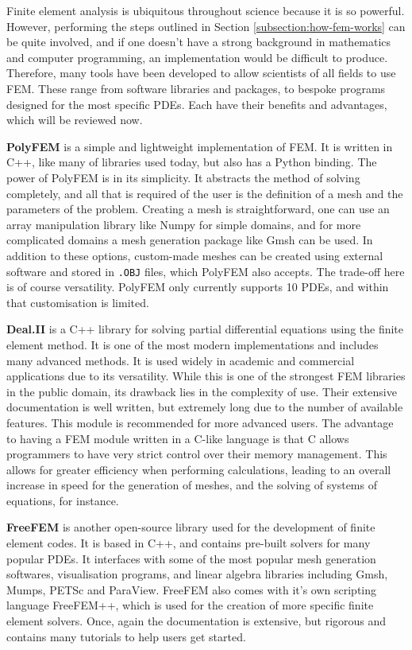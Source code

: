 Finite element analysis is ubiquitous throughout science because it is so powerful. However, performing the steps outlined in Section \ref{subsection:how-fem-works} can be quite involved, and if one doesn't have a strong background in mathematics and computer programming, an implementation would be difficult to produce. Therefore, many tools have been developed to allow scientists of all fields to use FEM. These range from software libraries and packages, to bespoke programs designed for the most specific PDEs. Each have their benefits and advantages, which will be reviewed now.

\textbf{PolyFEM} \cite{polyfem} is a simple and lightweight implementation of FEM. It is written in C++, like many of libraries used today, but also has a Python binding. The power of PolyFEM is in its simplicity. It abstracts the method of solving completely, and all that is required of the user is the definition of a mesh and the parameters of the problem. Creating a mesh is straightforward, one can use an array manipulation library like Numpy for simple domains, and for more complicated domains a mesh generation package like Gmsh can be used. In addition to these options, custom-made meshes can be created using external software and stored in \verb|.OBJ| files, which PolyFEM also accepts. The trade-off here is of course versatility. PolyFEM only currently supports 10 PDEs, and within that customisation is limited.

\textbf{Deal.II} \cite{deal-ii} is a C++ library for solving partial differential equations using the finite element method. It is one of the most modern implementations and includes many advanced methods. It is used widely in academic and commercial applications due to its versatility. While this is one of the strongest FEM libraries in the public domain, its drawback lies in the complexity of use. Their extensive documentation is well written, but extremely long due to the number of available features. This module is recommended for more advanced users. The advantage to having a FEM module written in a C-like language is that C allows programmers to have very strict control over their memory management. This allows for greater efficiency when performing calculations, leading to an overall increase in speed for the generation of meshes, and the solving of systems of equations, for instance.

\textbf{FreeFEM} \cite{freefem} is another open-source library used for the development of finite element codes. It is based in C++, and contains pre-built solvers for many popular PDEs. It interfaces with some of the most popular mesh generation softwares, visualisation programs, and linear algebra libraries including Gmsh, Mumps, PETSc and ParaView. FreeFEM also comes with it's own scripting language FreeFEM++, which is used for the creation of more specific finite element solvers. Once, again the documentation is extensive, but rigorous and contains many tutorials to help users get started.


